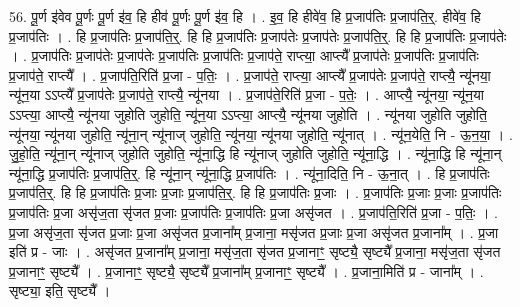 \documentclass[17pt]{extarticle}
\begin{document}
56. पू॒र्ण इ॑वेव पू॒र्णः पू॒र्ण इ॑व॒ हि हीव॑ पू॒र्णः पू॒र्ण इ॑व॒ हि । . इ॒व॒ हि हीवे॑व॒ हि प्र॒जाप॑तिः प्र॒जाप॑ति॒र्॒. हीवे॑व॒ हि प्र॒जाप॑तिः । . हि प्र॒जाप॑तिः प्र॒जाप॑ति॒र्॒. हि हि प्र॒जाप॑तिः प्र॒जाप॑तेः प्र॒जाप॑तेः प्र॒जाप॑ति॒र्॒. हि हि प्र॒जाप॑तिः प्र॒जाप॑तेः । . प्र॒जाप॑तिः प्र॒जाप॑तेः प्र॒जाप॑तेः प्र॒जाप॑तिः प्र॒जाप॑तिः प्र॒जाप॑ते॒ राप्त्या॒ आप्त्यै᳚ प्र॒जाप॑तेः प्र॒जाप॑तिः प्र॒जाप॑तिः प्र॒जाप॑ते॒ राप्त्यै᳚ । . प्र॒जाप॑ति॒रिति॑ प्र॒जा - प॒तिः॒ । . प्र॒जाप॑ते॒ राप्त्या॒ आप्त्यै᳚ प्र॒जाप॑तेः प्र॒जाप॑ते॒ राप्त्यै॒ न्यू॑नया॒ न्यू॑न॒या ऽऽप्त्यै᳚ प्र॒जाप॑तेः प्र॒जाप॑ते॒ राप्त्यै॒ न्यू॑नया । . प्र॒जाप॑ते॒रिति॑ प्र॒जा - प॒तेः॒ । . आप्त्यै॒ न्यू॑नया॒ न्यू॑न॒या ऽऽप्त्या॒ आप्त्यै॒ न्यू॑नया जुहोति जुहोति॒ न्यू॑न॒या ऽऽप्त्या॒ आप्त्यै॒ न्यू॑नया जुहोति । . न्यू॑नया जुहोति जुहोति॒ न्यू॑नया॒ न्यू॑नया जुहोति॒ न्यू॑ना॒न् न्यू॑नाज् जुहोति॒ न्यू॑नया॒ न्यू॑नया जुहोति॒ न्यू॑नात् । . न्यू॑न॒येति॒ नि - ऊ॒न॒या॒ । . जु॒हो॒ति॒ न्यू॑ना॒न् न्यू॑नाज् जुहोति जुहोति॒ न्यू॑ना॒द्धि हि न्यू॑नाज् जुहोति जुहोति॒ न्यू॑ना॒द्धि । . न्यू॑ना॒द्धि हि न्यू॑ना॒न् न्यू॑ना॒द्धि प्र॒जाप॑तिः प्र॒जाप॑ति॒र्॒. हि न्यू॑ना॒न् न्यू॑ना॒द्धि प्र॒जाप॑तिः । . न्यू॑ना॒दिति॒ नि - ऊ॒ना॒त् । . हि प्र॒जाप॑तिः प्र॒जाप॑ति॒र्॒. हि हि प्र॒जाप॑तिः प्र॒जाः प्र॒जाः प्र॒जाप॑ति॒र्॒. हि हि प्र॒जाप॑तिः प्र॒जाः । . प्र॒जाप॑तिः प्र॒जाः प्र॒जाः प्र॒जाप॑तिः प्र॒जाप॑तिः प्र॒जा असृ॑ज॒ता सृ॑जत प्र॒जाः प्र॒जाप॑तिः प्र॒जाप॑तिः प्र॒जा असृ॑जत । . प्र॒जाप॑ति॒रिति॑ प्र॒जा - प॒तिः॒ । . प्र॒जा असृ॑ज॒ता सृ॑जत प्र॒जाः प्र॒जा असृ॑जत प्र॒जाना᳚म् प्र॒जाना॒ मसृ॑जत प्र॒जाः प्र॒जा असृ॑जत प्र॒जाना᳚म् । . प्र॒जा इति॑ प्र - जाः । . असृ॑जत प्र॒जाना᳚म् प्र॒जाना॒ मसृ॑ज॒ता सृ॑जत प्र॒जानाꣳ॒॒ सृष्ट्यै॒ सृष्ट्यै᳚ प्र॒जाना॒ मसृ॑ज॒ता सृ॑जत प्र॒जानाꣳ॒॒ सृष्ट्यै᳚ । . प्र॒जानाꣳ॒॒ सृष्ट्यै॒ सृष्ट्यै᳚ प्र॒जाना᳚म् प्र॒जानाꣳ॒॒ सृष्ट्यै᳚ । . प्र॒जाना॒मिति॑ प्र - जाना᳚म् । . सृष्ट्या॒ इति॒ सृष्ट्यै᳚ । \newline
\pagebreak
{}
\end{document}
